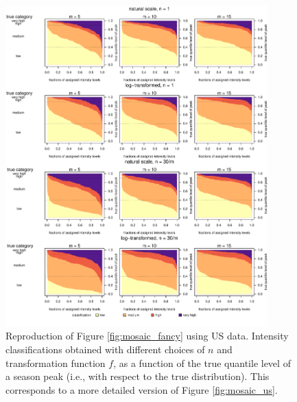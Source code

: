 \documentclass[12pt]{article}
\begin{document}
\begin{figure}[h!]
\includegraphics[width=0.9\textwidth]{figure/mosaic_fr_fancy.pdf}
\caption{Reproduction of Figure \ref{fig:mosaic_fancy} using US data. Intensity classifications obtained with different choices of $n$ and transformation function $f$, as a function of the true quantile level of a season peak (i.e., with respect to the true distribution). This corresponds to a more detailed version of Figure \ref{fig:mosaic_us}.}
\label{fig:mosaic_fancy_us}
\end{figure}

\newpage
\end{document}
